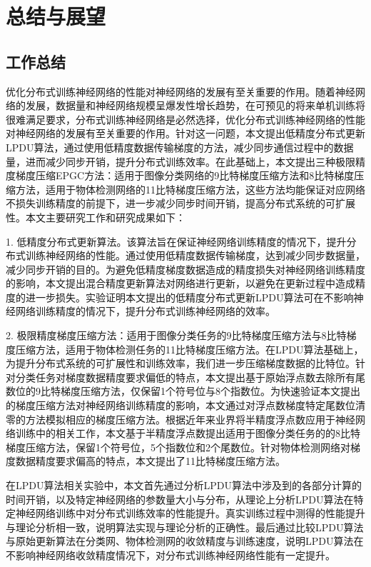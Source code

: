 \chapter{总结与展望}
\section{工作总结}
优化分布式训练神经网络的性能对神经网络的发展有至关重要的作用。随着神经网络的发展，数据量和神经网络规模呈爆发性增长趋势，在可预见的将来单机训练将很难满足要求，分布式训练神经网络是必然选择，优化分布式训练神经网络的性能对神经网络的发展有至关重要的作用。针对这一问题，本文提出低精度分布式更新LPDU算法，通过使用低精度数据传输梯度的方法，减少同步通信过程中的数据量，进而减少同步开销，提升分布式训练效率。在此基础上，本文提出三种极限精度梯度压缩EPGC方法：适用于图像分类网络的9比特梯度压缩方法和8比特梯度压缩方法，适用于物体检测网络的11比特梯度压缩方法，这些方法均能保证对应网络不损失训练精度的前提下，进一步减少同步时间开销，提高分布式系统的可扩展性。本文主要研究工作和研究成果如下：

1. 低精度分布式更新算法。该算法旨在保证神经网络训练精度的情况下，提升分布式训练神经网络的性能。通过使用低精度数据传输梯度，达到减少同步数据量，减少同步开销的目的。为避免低精度梯度数据造成的精度损失对神经网络训练精度的影响，本文提出混合精度更新算法对网络进行更新，以避免在更新过程中造成精度的进一步损失。实验证明本文提出的低精度分布式更新LPDU算法可在不影响神经网络训练精度的情况下，提升分布式训练神经网络的效率。

2. 极限精度梯度压缩方法：适用于图像分类任务的9比特梯度压缩方法与8比特梯度压缩方法，适用于物体检测任务的11比特梯度压缩方法。在LPDU算法基础上，为提升分布式系统的可扩展性和训练效率，我们进一步压缩梯度数据的比特位。针对分类任务对梯度数据精度要求偏低的特点，本文提出基于原始浮点数去除所有尾数位的9比特梯度压缩方法，仅保留1个符号位与8个指数位。为快速验证本文提出的梯度压缩方法对神经网络训练精度的影响，本文通过对浮点数梯度特定尾数位清零的方法模拟相应的梯度压缩方法。根据近年来业界将半精度浮点数应用于神经网络训练中的相关工作，本文基于半精度浮点数提出适用于图像分类任务的的8比特梯度压缩方法，保留1个符号位，5个指数位和2个尾数位。针对物体检测网络对梯度数据精度要求偏高的特点，本文提出了11比特梯度压缩方法。

在LPDU算法相关实验中，本文首先通过分析LPDU算法中涉及到的各部分计算的时间开销，以及特定神经网络的参数量大小与分布，从理论上分析LPDU算法在特定神经网络训练中对分布式训练效率的性能提升。真实训练过程中测得的性能提升与理论分析相一致，说明算法实现与理论分析的正确性。最后通过比较LPDU算法与原始更新算法在分类网、物体检测网的收敛精度与训练速度，说明LPDU算法在不影响神经网络收敛精度情况下，对分布式训练神经网络性能有一定提升。


